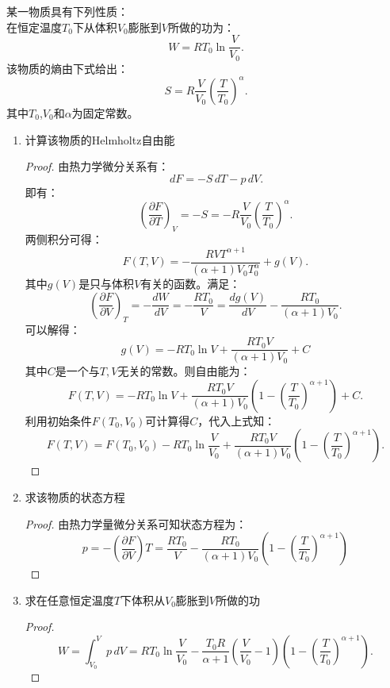\documentclass[reqno,a4paper,12pt]{amsart}
\begin{document}
\section{}
	某一物质具有下列性质： \\
	在恒定温度$T_0$下从体积$V_0$膨胀到$V$所做的功为：
	\begin{equation*}
		W = RT_0\ln\frac{V}{V_0}.
	\end{equation*}
	该物质的熵由下式给出：
	\begin{equation*}
		S = R\frac{V}{V_0}\left( \frac{T}{T_0} \right)^\alpha.
	\end{equation*}
	其中$T_0$,$V_0$和$\alpha$为固定常数。
\begin{enumerate}
	\item 计算该物质的Helmholtz自由能
	\begin{proof}
		由热力学微分关系有：
		\[
			\,dF = -S\,dT - p\,dV.
		\]
		即有：
		\[
			\left( \frac{\partial F}{\partial T} \right)_V = -S = -R\frac{V}{V_0}\left( \frac{T}{T_0} \right)^\alpha.
		\]
		两侧积分可得：
		\[
			F(T, V) = -\frac{RVT^{\alpha+1}}{(\alpha+1)V_0T_0^{\alpha}} + g(V).
		\]
		其中$g(V)$是只与体积$V$有关的函数。满足：
		\[
			\left( \frac{\partial F}{\partial V} \right)_T = -\frac{dW}{dV} = -\frac{RT_0}{V} = \frac{d g(V)}{dV} - \frac{RT_0}{(\alpha+1)V_0}.
		\]
		可以解得：
		\[
			g(V) = -RT_0\ln V + \frac{RT_0V}{(\alpha+1)V_0} + C
		\]
		其中$C$是一个与$T,V$无关的常数。则自由能为：
		\[
			F(T, V) = -RT_0\ln V + \frac{RT_0V}{(\alpha+1)V_0}\left( 1 - \left( \frac{T}{T_0} \right)^{\alpha+1} \right) + C.
		\]
		利用初始条件$F(T_0, V_0)$可计算得$C$，代入上式知：
		\[
			F(T, V) = F(T_0, V_0) - RT_0\ln\frac{V}{V_0} + \frac{RT_0V}{(\alpha+1)V_0}\left( 1 - \left( \frac{T}{T_0} \right)^{\alpha+1} \right).
		\]
	\end{proof}
	
	\item 求该物质的状态方程
	\begin{proof}
		由热力学量微分关系可知状态方程为：
		\[
			p = -\left( \frac{\partial F}{\partial V} \right)T = \frac{RT_0}{V} - \frac{RT_0}{(\alpha+1)V_0} \left( 1 - \left( \frac{T}{T_0} \right)^{\alpha+1} \right)
		\]
	\end{proof}
	
	\item 求在任意恒定温度$T$下体积从$V_0$膨胀到$V$所做的功
	\begin{proof}
		\[
			W = \int_{V_0}^V p\,dV = RT_0\ln\frac{V}{V_0} - \frac{T_0R}{\alpha+1}\left( \frac{V}{V_0}-1 \right)\left( 1 - \left( \frac{T}{T_0} \right)^{\alpha+1} \right).
		\]
	\end{proof}
\end{enumerate}
\end{document}
